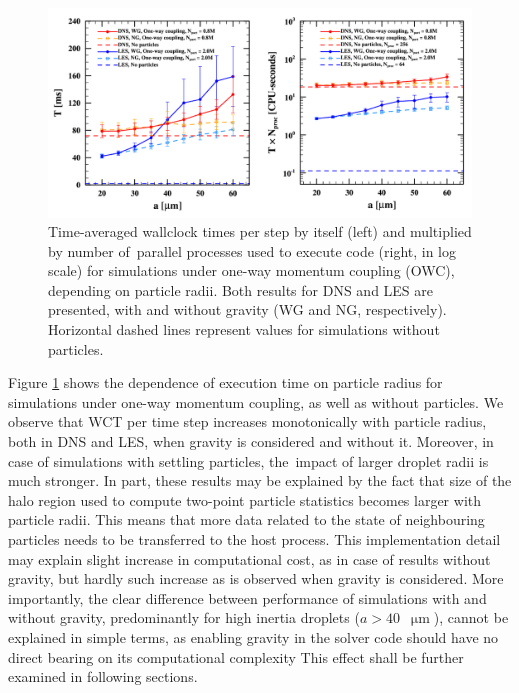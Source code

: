 \documentclass{pracamgren}
\begin{document}
\begin{figure}[h]
\centering
\includegraphics[width=13.5cm]{img/plots/3-2a-pfsowc.pdf}
\caption{
Time-averaged wallclock times per step by itself (left) and multiplied by number of~parallel processes used to execute code (right, in log scale) for simulations under one-way momentum coupling (OWC), depending on particle radii. Both results for DNS and LES are presented, with and without gravity (WG and NG, respectively). Horizontal dashed lines represent values for simulations without particles.
}
\label{fig:pfsowc}
\end{figure}

Figure \ref{fig:pfsowc} shows the dependence of execution time on particle radius for simulations under one-way momentum coupling, as well as without particles.
We observe that WCT per time step increases monotonically with particle radius, both in DNS and LES, when gravity is considered and without it.
Moreover, in case of simulations with settling particles, the~impact of larger droplet radii is much stronger.
In part, these results may be explained by the fact that size of the halo region used to compute two-point particle statistics becomes larger with particle radii.
This means that more data related to the state of neighbouring particles needs to be transferred to the host process.
This implementation detail may explain slight increase in computational cost, as in case of results without gravity, but hardly such increase as is observed when gravity is considered.
More importantly, the clear difference between performance of simulations with and without gravity, predominantly for high inertia droplets ($a > 40$~$\upmu\text{m}$), cannot be explained in simple terms, as enabling gravity in the solver code should have no direct bearing on its computational complexity
This effect shall be further examined in following sections.
\end{document}
